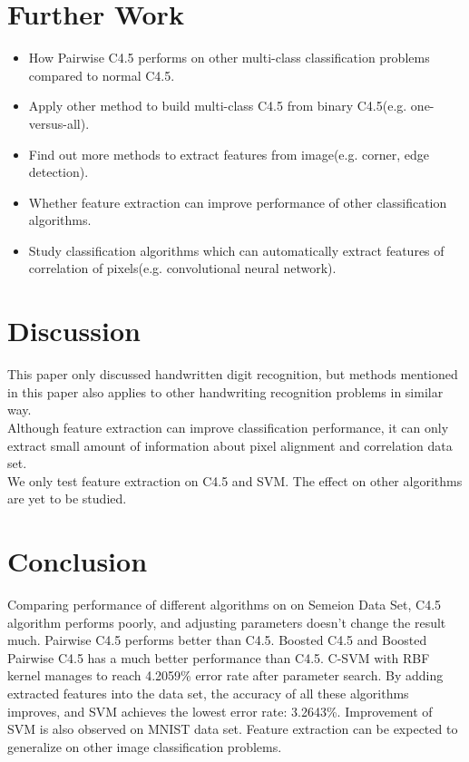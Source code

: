 \documentclass[a4paper,11pt]{article}
\begin{document}
\section{Further Work}
\begin{itemize}
 \item How Pairwise C4.5 performs on other multi-class classification problems compared to normal C4.5.
 \item Apply other method to build multi-class C4.5 from binary C4.5(e.g. one-versus-all).
 \item Find out more methods to extract features from image(e.g. corner, edge detection).
 \item Whether feature extraction can improve performance of other classification algorithms.
 \item Study classification algorithms which can automatically extract features of correlation of pixels(e.g. convolutional neural network\cite{lecun98}).
\end{itemize}
\section{Discussion}
This paper only discussed handwritten digit recognition, but methods mentioned in this paper also applies to other handwriting recognition problems in similar way.\\
Although feature extraction can improve classification performance, it can only extract small amount of information about pixel alignment and correlation data set. \\
We only test feature extraction on C4.5 and SVM. The effect on other algorithms are yet to be studied.\\

\section{Conclusion}
Comparing performance of different algorithms on on Semeion Data Set, C4.5 algorithm performs poorly, and adjusting parameters doesn't change the result much. Pairwise C4.5 performs better than C4.5. Boosted C4.5 and Boosted Pairwise C4.5 has a much better performance than C4.5. C-SVM with RBF kernel manages to reach 4.2059\% error rate after parameter search. By adding extracted features into the data set, the accuracy of all these algorithms improves, and SVM achieves the lowest error rate: 3.2643\%. Improvement of SVM is also observed on MNIST data set. Feature extraction can be expected to generalize on other image classification problems.

\newpage


\end{document}
